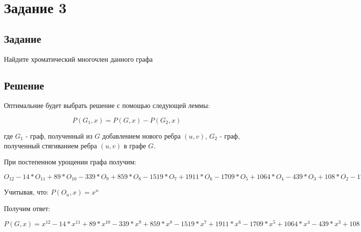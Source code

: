 \section*{Задание 3}

\subsection*{Задание}

Найдите хроматический многочлен данного графа

\begin{figure}[H]
    \centering
\end{figure}

\subsection*{Решение}

Оптимальние будет выбрать решение с помощью следующей леммы:

$$ P(G_1,x) = P(G,x) - P(G_2,x) $$

где
$ G_1 $ - граф, полученный из $ G $ добавлением нового ребра $ (u, v) $,
$ G_2 $ - граф, полученный стягиванием ребра $ (u, v) $ в графе $ G $.

При постепенном урощении графа получим:

$
O_{12}
- 14 * O_{11}
+ 89 * O_{10}
- 339 * O_{9}
+ 859 * O_{8}
- 1519 * O_{7}
+ 1911 * O_{6}
- 1709 * O_{5}
+ 1064 * O_{4}
- 439 * O_{3}
+ 108 * O_{2}
- 12 * O_{1}
$

Учитывая, что:
$ P(O_n, x) = x^{n} $

Получим ответ:

$
P(G, x) =
x^{12}
- 14 * x^{11}
+ 89 * x^{10}
- 339 * x^{9}
+ 859 * x^{8}
- 1519 * x^{7}
+ 1911 * x^{6}
- 1709 * x^{5}
+ 1064 * x^{4}
- 439 * x^{3}
+ 108 * x^{2}
- 12 * x
$
